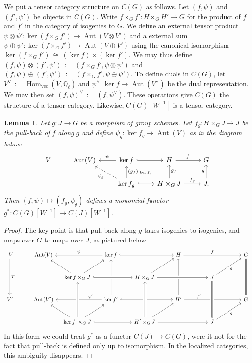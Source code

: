 \documentclass[11pt]{amsart}
\theoremstyle{plain}
\newtheorem{lemma}[theorem]{Lemma}
\theoremstyle{definition}
\theoremstyle{remark}
\newcommand{\EE}{\mathbb{\bar Q}_\ell}
\DeclareMathOperator{\Aut}{Aut}
\DeclareMathOperator{\Hom}{Hom}
\newcommand{\ceq}{{\, :=\, }}
\newcommand{\iso}{{\ \cong\ }}
\begin{document}
We put a tensor category structure on $C(G)$ as follows.
Let $(f,\psi)$ and $(f',\psi')$ be objects in $C(G)$. 
Write $f\times_G f' : H\times_G H' \to G$ for the product of $f$ and $f'$
in the category of isogenies to $G$. We define an external tensor product
$\psi \otimes\psi' :  \ker(f\times_G f') \to \Aut(V\otimes V')$ and a external sum
$\psi \oplus\psi' :  \ker(f\times_G f') \to \Aut(V\oplus V')$
using the canonical isomorphism $\ker(f\times_G f') \iso (\ker f)\times (\ker f')$.
We may thus define $(f,\psi)\otimes(f',\psi') \ceq (f\times_G f' ,\psi\otimes\psi')$ and
$(f,\psi)\oplus(f',\psi')\ceq (f\times_G f' ,\psi\oplus\psi')$. To define duals in $C(G)$,
let $V^\vee \ceq \Hom_\text{vec}(V,\EE)$ and $\psi^\vee : \ker f \to \Aut(V^\vee)$ be
the dual representation.  We may then set $(f,\psi)^\vee \ceq (f,\psi^\vee)$.
These operations give $C(G)$ the structure of a tensor category.
Likewise, $C(G)[W^{-1}]$ is a tensor category.

\begin{lemma}\label{lemma:finite-pull-back}
Let $g : J \to G$ be a morphism of group schemes. 
Let $f_g : H\times_G J\to J$
be the pull-back of $f$ along $g$ and define $\psi_g : \ker f_g \to \Aut(V)$ as in the diagram below:
\[
\begin{tikzcd}
V & \Aut(V) & \arrow[swap]{l}{\psi} \ker f \arrow[hook]{r} & H \arrow{r}{f} &  G\\
  &  & \arrow[dashed]{ul}{\psi_g} \arrow[swap]{u}{(g_f)\vert_{\ker f_g}} \ker f_g \arrow[hook]{r}
  & \arrow[swap]{u}{g_f} H\times_G J \arrow{r}{f_g} & \arrow{u}{g} J.
\end{tikzcd}
\]
Then $(f,\psi) \mapsto (f_g,\psi_g)$
defines a monomial functor $g^* : C(G)[W^{-1}] \to C(J)[W^{-1}]$.
\end{lemma}

\begin{proof}
The key point is that pull-back along $g$ takes isogenies to isogenies,
and maps over $G$ to maps over $J$, as pictured below.
\[
\begin{tikzcd}[row sep={{{{40,between origins}}}},column sep={{{{60,between origins}}}}]
\ V \arrow{dd}{T} & \Aut(V) && \arrow[swap]{ll}{\psi} \ker f \arrow[hook]{rr} \arrow[leftarrow]{dd} && H \arrow{rr}{f} \arrow[leftarrow]{dd} && \arrow[equal]{dd} G\\
 & & \arrow{ul} \ker f\times_G J \arrow{ur} \arrow[hook, crossing over]{rr} && H\times_G J \arrow{ur} \arrow[crossing over]{rr} && J \arrow[swap]{ur}{g} & \\
V' & \Aut(V') && \arrow[swap,pos=0.25]{ll}{\psi'} \ker f'  \arrow[hook]{rr}
&& H' \arrow[pos=0.25]{rr}{f'} && G\\
 & & \arrow{ul} \ker f'\times_G J \arrow[crossing over]{uu} \arrow{ur} \arrow[hook]{rr}
 && \arrow[crossing over]{uu} H'\times_G J \arrow{ur} \arrow{rr} && \arrow[equals, crossing over]{uu} J \arrow[swap]{ur}{g} & 
\end{tikzcd}
\]
In this form we could treat $g^*$ as a functor $C(J)\to C(G)$,
were it not for the fact that pull-back is defined only up to isomorphism.
In the localized categories, this ambiguity disappears. 
\end{proof}
\end{document}
